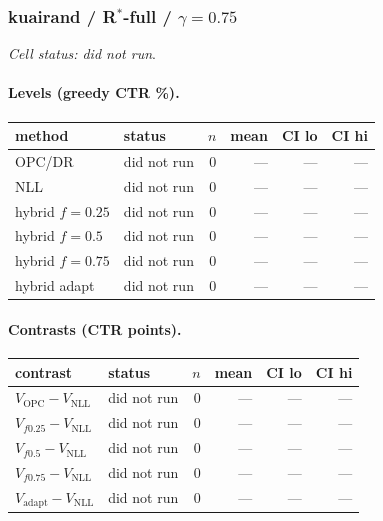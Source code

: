 \documentclass[10pt,a4paper]{article}
\begin{document}
\subsubsection{kuairand / R$^*$-full / $\gamma=0.75$}
\emph{Cell status: did not run}.
\paragraph{Levels (greedy CTR \%).}
{\centering\small\begin{tabular}{llrrrr}
\toprule method & status & $n$ & mean & CI lo & CI hi \\
\midrule
OPC/DR & did not run & 0 & --- & --- & --- \\
NLL & did not run & 0 & --- & --- & --- \\
hybrid $f{=}0.25$ & did not run & 0 & --- & --- & --- \\
hybrid $f{=}0.5$ & did not run & 0 & --- & --- & --- \\
hybrid $f{=}0.75$ & did not run & 0 & --- & --- & --- \\
hybrid adapt & did not run & 0 & --- & --- & --- \\
\bottomrule\end{tabular}\par}
\paragraph{Contrasts (CTR points).}
{\centering\small\begin{tabular}{llrrrr}
\toprule contrast & status & $n$ & mean & CI lo & CI hi \\
\midrule
$V_{\mathrm{OPC}}-V_{\mathrm{NLL}}$ & did not run & 0 & --- & --- & --- \\
$V_{f0.25}-V_{\mathrm{NLL}}$ & did not run & 0 & --- & --- & --- \\
$V_{f0.5}-V_{\mathrm{NLL}}$ & did not run & 0 & --- & --- & --- \\
$V_{f0.75}-V_{\mathrm{NLL}}$ & did not run & 0 & --- & --- & --- \\
$V_{\mathrm{adapt}}-V_{\mathrm{NLL}}$ & did not run & 0 & --- & --- & --- \\
\bottomrule\end{tabular}\par}
\end{document}
